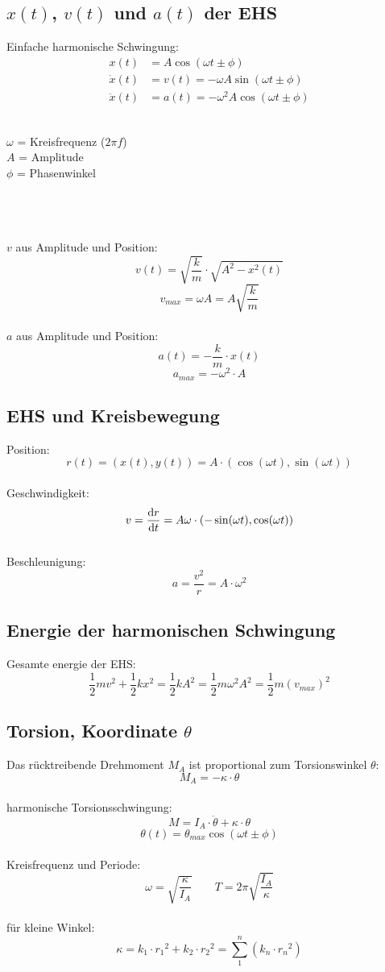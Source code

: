 \subsection{$x(t)$, $v(t)$ und $a(t)$ der EHS}
Einfache harmonische Schwingung:
\[
\boxed{\begin{aligned}
	x(t) &= A \cos \left( \omega t \pm \phi \right) \\
	\dot{x}(t) &= v(t) = -\omega A \sin \left( \omega t \pm \phi \right) \\
	\ddot{x}(t) &= a(t) = -\omega^2 A \cos \left( \omega t \pm \phi \right)
\end{aligned}}\]
\\
\begin{footnotesize}
	$\omega$ = Kreisfrequenz ($2 \pi f$) \\
	$A$ = Amplitude \\
	$\phi$ = Phasenwinkel
\end{footnotesize}
\\
\\\\
$v$ aus Amplitude und Position:
\[
	v(t) = \sqrt{\frac{k}{m}} \cdot \sqrt{A^2-x^2(t)}
\]
\[
	v_{max} = \omega A = A\sqrt{\frac{k}{m}}
\]
\\
$a$ aus Amplitude und Position:
\[
	a(t) = -\frac{k}{m} \cdot x(t)
\]
\[
	a_{max} = -\omega^2\cdot A
\]
\subsection{EHS und Kreisbewegung}
Position:
\[
	r(t) = (x(t),y(t)) = A \cdot (\cos(\omega t), \sin(\omega t))
\]
\\
Geschwindigkeit:
\[
	v = \frac{\mathrm{d} r}{\mathrm{d} t} = A \omega \cdot (-\sin(\omega t), \cos(\omega t))
\]
\\
Beschleunigung:
\[
	a = \frac{v^2}{r} = A \cdot \omega^2
\]


\subsection{Energie der harmonischen Schwingung}
Gesamte energie der EHS:
\[\boxed{
	\frac12 mv^2 + \frac12kx^2 = \frac12kA^2 = \frac12m\omega^2 A^2 = \frac12 m (v_{max})^2
}\]


\subsection{Torsion, Koordinate $\theta$}
Das rücktreibende Drehmoment $M_A$ ist proportional zum Torsionswinkel $\theta$:
\[
	M_A = -\kappa \cdot \theta
\]
\\
harmonische Torsionsschwingung:
\[
	M = I_A \cdot \ddot{\theta} + \kappa \cdot \theta
\]
\[
	\theta(t) = \theta_{max} \cos(\omega t \pm \phi)
\]
\\
Kreisfrequenz und Periode:
\[\boxed{
	\omega = \sqrt{\frac{\kappa}{I_A}} \qquad T = 2 \pi \sqrt{\frac{I_A}{\kappa}}
}\]
\\
für kleine Winkel:
\[
	\kappa = k_1 \cdot {r_1}^2 + k_2 \cdot {r_2}^2 = \sum_{1}^{n}(k_n \cdot {r_n}^2)
\]


